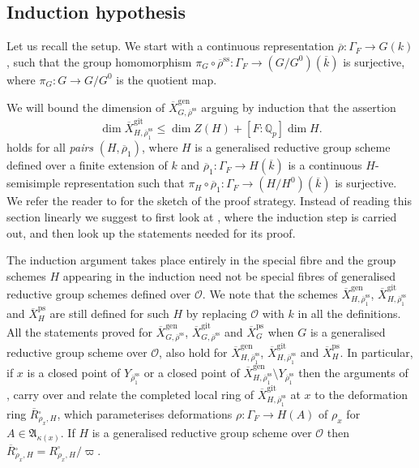 \documentclass{amsart}
\theoremstyle{definition}
\theoremstyle{remark}
\newcommand{\Qp}{\mathbb {Q}_p}
\newcommand{\Aa}{\mathfrak A}
\newcommand{\OO}{\mathcal O}
\newcommand{\rhobar}{\overline{\rho}}
\newcommand{\ps}{\mathrm{ps}}
\newcommand{\gen}{\mathrm{gen}}
\newcommand{\gps}{\mathrm{git}}
\newcommand{\Xbar}{\overline{X}}
\newcommand{\kbar}{\overline{k}}
\newcommand{\rhobarss}{\rhobar^{\mathrm{ss}}}
\newcommand{\git}{\mathrm{git}}
\newcommand{\Rbar}{\overline{R}}
\begin{document}
\subsection{Induction hypothesis}\label{ind_hyp}

Let us recall the setup. We start with a continuous representation $\rhobar: \Gamma_F \rightarrow G(k)$, such that 
the group homomorphism $\pi_G\circ\rhobarss: \Gamma_F \rightarrow (G/G^0)(\overline{k})$ is surjective, where
$\pi_G: G\rightarrow G/G^0$ is the quotient map. 

We will bound the dimension of $\Xbar^{\gen}_{G, \rhobarss}$ arguing by  induction 
 that the assertion 
\begin{equation}\label{dim_pair} 
\dim \Xbar^{\gps}_{H, \rhobar_1^{\mathrm{ss}}} \le \dim Z(H) + [F:\Qp] \dim H \tag{DIM}.
\end{equation} 
holds for all \emph{pairs} $(H, \rhobar_1)$, where $H$ is a generalised reductive group
scheme defined over a finite extension of $k$ and $\rhobar_1: \Gamma_F\rightarrow H(\kbar)$ is a continuous $H$-semisimple representation
such that $\pi_H\circ \rhobar_1: \Gamma_F\rightarrow (H/H^0)(\overline{k})$ is surjective. We refer the reader to  for the sketch of the proof strategy. Instead of reading this section linearly we suggest to first look at , where the induction step is carried out, and then 
look up the statements needed for its proof. 

The induction argument takes place entirely in the special fibre and the group schemes $H$ appearing in the induction need not be special fibres of 
generalised reductive group schemes defined over $\OO$. We note that the 
schemes $\Xbar^{\gen}_{H, \rhobar_1^{\mathrm{ss}}}$, $\Xbar^{\git}_{H,\rhobar_1^{\mathrm{ss}}}$ and $\Xbar^{\ps}_H$ are still defined for such $H$ by replacing $\OO$ with $k$ in all the definitions.
All the statements proved for $\Xbar^{\gen}_{G, \rhobarss}$, $\Xbar^{\git}_{G, \rhobarss}$ and $\Xbar^{\ps}_G$ when 
$G$ is a generalised reductive group scheme over $\OO$, also hold 
for $\Xbar^{\gen}_{H, \rhobarss_1}$, $\Xbar^{\git}_{H, \rhobarss_1}$ and $\Xbar^{\ps}_H$. In particular, 
if $x$ is a closed point of $Y_{\rhobarss_1}$ or a closed point of 
$\Xbar^{\gen}_{H, \rhobarss_1}\setminus Y_{\rhobarss_1}$ then the arguments of , 
 carry over and relate the completed
local ring of $\Xbar^{\git}_{H,\rhobar_1^{\mathrm{ss}}}$ at $x$ to the deformation 
ring $\Rbar{}^{\square}_{\rho_x, H}$, which 
parameterises deformations $\rho: \Gamma_F\rightarrow H(A)$ of $\rho_x$ for 
$A\in \Aa_{\kappa(x)}$. If $H$ is a generalised reductive group scheme
over $\OO$ then $\Rbar{}^{\square}_{\rho_x, H}=R^{\square}_{\rho_x, H}/\varpi$. 
\end{document}
